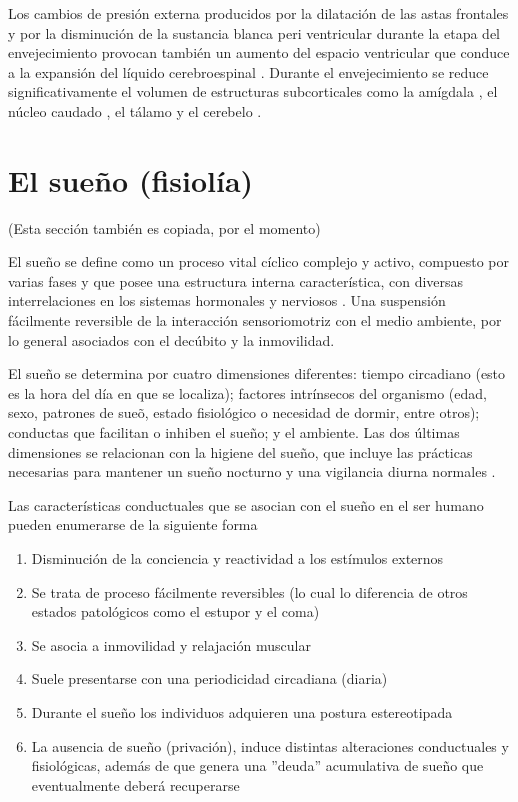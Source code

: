 Los cambios de presi\'on externa producidos por la dilataci\'on de las astas frontales y por la 
disminuci\'on de la sustancia blanca peri ventricular durante la etapa del envejecimiento 
provocan tambi\'en un aumento del espacio ventricular que conduce a la expansi\'on del l\'iquido 
cerebroespinal \cite{Hita14,Raz05}.
Durante el envejecimiento se reduce significativamente el volumen de estructuras subcorticales 
como la am\'igdala \cite{Allen05}, el n\'ucleo caudado \cite{Raz05}, el t\'alamo 
\cite{CarrilloMora} y el cerebelo \cite{Hita14}.


\section{El sue\~no (fisiol\'ia)}

(Esta secci\'on tambi\'en es copiada, por el momento)

El sue\~no se define como un proceso vital c\'iclico complejo y activo, compuesto por varias 
fases y que posee una estructura interna caracter\'istica, con diversas interrelaciones en los 
sistemas hormonales y nerviosos \cite{FernandezConde07}. Una suspensi\'on f\'acilmente reversible 
de la interacci\'on sensoriomotriz con el medio ambiente, por lo general asociados con el 
dec\'ubito y la inmovilidad.

El sue\~no se determina por cuatro dimensiones diferentes: tiempo circadiano (esto es la hora 
del d\'ia en que se localiza); factores intr\'insecos del organismo (edad, sexo, patrones de 
sue\~o, estado fisiol\'ogico o necesidad de dormir, entre otros); conductas que facilitan o 
inhiben el sue\~no; y el ambiente. Las dos \'ultimas dimensiones se relacionan con la higiene 
del sueño, que incluye las pr\'acticas necesarias para mantener un sue\~no nocturno y una 
vigilancia diurna normales \cite{Sierra02}.

Las caracter\'isticas conductuales que se asocian con el sue\~no en el ser humano pueden 
enumerarse de la siguiente forma\cite{CarrilloMora} 
\begin{enumerate}
\item Disminuci\'on de la conciencia y reactividad a los est\'imulos externos
\item Se trata de proceso f\'acilmente reversibles (lo cual lo diferencia de otros estados 
patol\'ogicos como el estupor y el coma)
\item Se asocia a inmovilidad y relajaci\'on muscular
\item Suele presentarse con una periodicidad circadiana (diaria)
\item Durante el sue\~no los individuos adquieren una postura estereotipada
\item La ausencia de sue\~no (privaci\'on), induce distintas alteraciones conductuales y 
fisiol\'ogicas, adem\'as de que genera una ''deuda'' acumulativa de sueño que eventualmente 
deber\'a recuperarse 
\end{enumerate}

